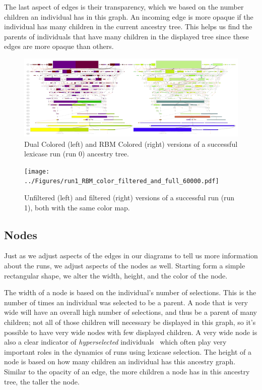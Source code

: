 \documentclass{sig-alternate}
\begin{document}
The last aspect of edges is their transparency, which we based on the number children an 
individual has in this graph. An incoming edge is more opaque if the individual has many 
children in the current ancestry tree. This helps us find the parents of individuals that have
many children in the displayed tree since these edges are more opaque than others.

\begin{figure}
	\begin{center}
		\includegraphics[width=\textwidth]{../Figures/run0_dual_and_RBM_full.pdf}
	\end{center}
	\caption{Dual Colored (left) and RBM Colored (right) versions of a successful lexicase run (run 0) ancestry tree.}
	\label{fig:lexRun0DualAndRBM}
\end{figure}

\begin{figure}
	\begin{center}
		\texttt{[image: ../Figures/run1\_RBM\_color\_filtered\_and\_full\_60000.pdf]}
	\end{center}
	\caption{Unfiltered (left) and filtered (right) versions of a successful run (run 1), both with the same color map.}
	\label{fig:lexRun1FilteredAndFull}
\end{figure}

\subsection{Nodes}
\label{sec:nodes}

Just as we adjust aspects of the edges in our diagrams to tell us more information about 
the runs, we adjust aspects of the nodes as well. Starting form a simple rectangular 
shape, we alter the width, height, and the color of the node.

The width of a node is based on the individual's number of selections. This is the number 
of times an individual was selected to be a parent. A node that is very wide will have an 
overall high number of selections, and thus be a parent of many children; not all of those
children will necessary be displayed in this graph, so it's possible to have very wide
nodes with few displayed children. A very wide node is also a clear indicator of
\emph{hyperselected} individuals~\cite{Helmuth:2016:GECCO} which often play very
important roles in the dynamics of runs using lexicase selection.
The height of a node is based on how many children an individual has this ancestry
graph. Similar to the opacity of an edge, the more children a node has in this ancestry 
tree, the taller the node.
\end{document}
